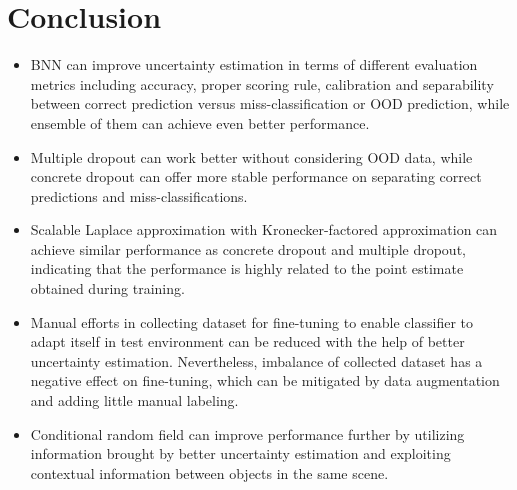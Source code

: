 \section{Conclusion}
\begin{itemize}
	\item \gls{BNN} can improve uncertainty estimation in terms of different evaluation metrics including accuracy, proper scoring rule, calibration and separability between correct prediction versus miss-classification or \gls{OOD} prediction, while ensemble of them can achieve even better performance.
	
	\item Multiple dropout can work better without considering \gls{OOD} data, while concrete dropout can offer more stable performance on separating correct predictions and miss-classifications.
	
	\item Scalable Laplace approximation with Kronecker-factored approximation can achieve similar performance as concrete dropout and multiple dropout, indicating that the performance is highly related to the point estimate obtained during training.
	
	\item Manual efforts in collecting dataset for fine-tuning to enable classifier to adapt itself in test environment can be reduced with the help of better uncertainty estimation. Nevertheless, imbalance of collected dataset has a negative effect on fine-tuning, which can be mitigated by data augmentation and adding little manual labeling.
	
	\item Conditional random field can improve performance further by utilizing information brought by better uncertainty estimation and exploiting contextual information between objects in the same scene.
	
\end{itemize}


